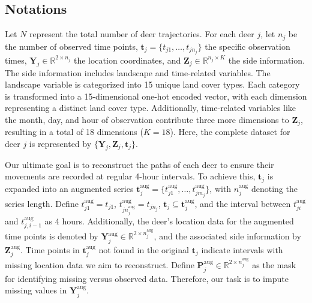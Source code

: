 \documentclass[11pt]{article}
\begin{document}
\subsection{Notations}
Let $N$ represent the total number of deer trajectories. For each deer $j$, let $n_j$ be the number of observed time points, $\bm{t}_j = \{t_{j1}, \ldots, t_{jn_j}\}$ the specific observation times, $\bm{Y}_j \in \mathbb{R}^{2 \times n_j}$ the location coordinates, and $\bm{Z}_j \in \mathbb{R}^{n_j \times K}$ the side information. The side information includes landscape and time-related variables. The landscape variable is categorized into 15 unique land cover types. Each category is transformed into a 15-dimensional one-hot encoded vector, with each dimension representing a distinct land cover type. Additionally, time-related variables like the month, day, and hour of observation contribute three more dimensions to $\bm{Z}_j$, resulting in a total of 18 dimensions ($K=18$). Here, the complete dataset for deer $j$ is represented by $\{\bm{Y}_j, \bm{Z}_j, \bm{t}_j\}$.


Our ultimate goal is to reconstruct the paths of each deer to ensure their movements are recorded at regular 4-hour intervals. To achieve this, $\bm{t}_j$ is expanded into an augmented series $\bm{t}_j^{\mathrm{aug}}=\{t_{j1}^{\mathrm{aug}},\ldots,t_{jm_j}^{\mathrm{aug}}\}$, with $n_j^{\mathrm{aug}}$ denoting the series length. Define $t_{j1}^{\mathrm{aug}}=t_{j1}$, $t_{jn_j^{\mathrm{aug}}}^{\mathrm{aug}}=t_{jn_j}$, $\bm{t}_j\subseteq \bm{t}_j^{\mathrm{aug}}$, and the interval between $t_{ji}^{\mathrm{aug}}$ and $t_{j,i-1}^{\mathrm{aug}}$ as 4 hours. Additionally, the deer's location data for the augmented time points is denoted by $\bm{Y}_j^{\mathrm{aug}}\in \mathbb{R}^{2\times n_j^{\mathrm{aug}}}$, and the associated side information by $\bm{Z}_j^{\mathrm{aug}}$. Time points in $\bm{t}_j^{\mathrm{aug}}$ not found in the original $\bm{t}_j$ indicate intervals with missing location data we aim to reconstruct. Define $\bm{P}_j^{\mathrm{aug}}\in \mathbb{R}^{2\times n_j^{\mathrm{aug}}}$ as the mask for identifying missing versus observed data. Therefore, our task is to impute missing values in $\bm{Y}_j^{\mathrm{aug}}$.
\end{document}
